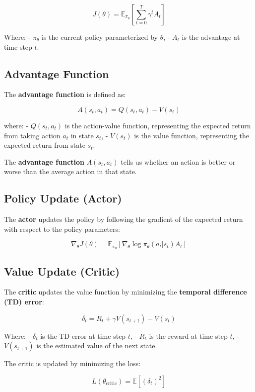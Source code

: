\documentclass[
]{book}
\begin{document}
\[
J(\theta) = \mathbb{E}_{\pi_\theta} \left[ \sum_{t=0}^{T} \gamma^t A_t \right]
\]

Where:
- \(\pi_\theta\) is the current policy parameterized by \(\theta\),
- \(A_t\) is the advantage at time step \(t\).

\subsection{Advantage Function}\label{advantage-function}

The \textbf{advantage function} is defined as:

\[
A(s_t, a_t) = Q(s_t, a_t) - V(s_t)
\]

where:
- \(Q(s_t, a_t)\) is the action-value function, representing the expected return from taking action \(a_t\) in state \(s_t\),
- \(V(s_t)\) is the value function, representing the expected return from state \(s_t\).

The \textbf{advantage function} \(A(s_t, a_t)\) tells us whether an action is better or worse than the average action in that state.

\subsection{Policy Update (Actor)}\label{policy-update-actor}

The \textbf{actor} updates the policy by following the gradient of the expected return with respect to the policy parameters:

\[
\nabla_\theta J(\theta) = \mathbb{E}_{\pi_\theta} \left[ \nabla_\theta \log \pi_\theta(a_t | s_t) A_t \right]
\]

\subsection{Value Update (Critic)}\label{value-update-critic}

The \textbf{critic} updates the value function by minimizing the \textbf{temporal difference (TD) error}:

\[
\delta_t = R_t + \gamma V(s_{t+1}) - V(s_t)
\]

Where:
- \(\delta_t\) is the TD error at time step \(t\),
- \(R_t\) is the reward at time step \(t\),
- \(V(s_{t+1})\) is the estimated value of the next state.

The critic is updated by minimizing the loss:

\[
L(\theta_{\text{critic}}) = \mathbb{E} \left[ (\delta_t)^2 \right]
\]
\end{document}
